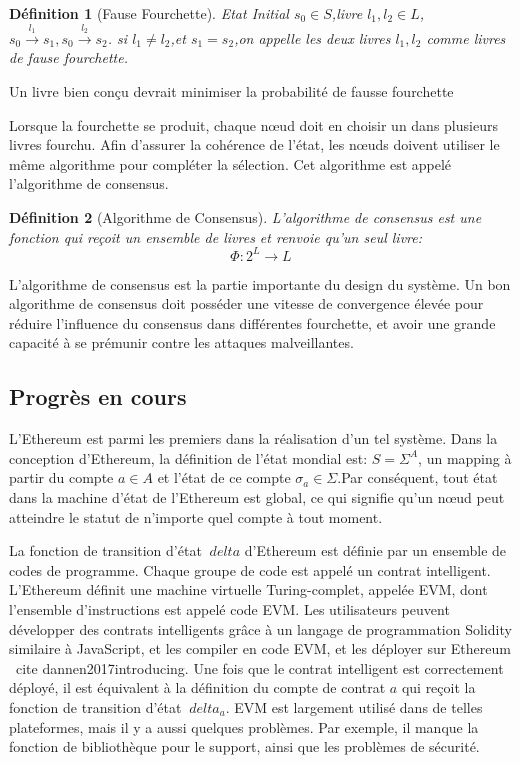 \documentclass[UTF8,nofonts]{article}
\newtheorem{definition}{Définition}[section]
\begin{document}
\begin{multicols}{2}
\begin{definition}[Fause Fourchette] \label{def:fausefourchette}
Etat Initial  $s_{0} \in S$,livre $l_{1},l_{2} \in L$,$s_{0}\overset{l_{1}}{\rightarrow}s_{1}, s_{0}\overset{l_{2}}{\rightarrow}s_{2}$. si $l_{1} \neq l_{2}$,et $s_{1}=s_{2}$,on appelle les deux livres $l_{1} ,l_{2}$ comme livres de fause fourchette.
\end{definition}

Un livre bien conçu devrait minimiser la probabilité de fausse fourchette

Lorsque la fourchette se produit, chaque nœud doit en choisir un dans plusieurs livres fourchu. Afin d'assurer la cohérence de l'état, les nœuds doivent utiliser le même algorithme pour compléter la sélection. Cet algorithme est appelé l'algorithme de consensus.

\begin{definition}[Algorithme de Consensus] \label{def:consensus}
L'algorithme de consensus est une fonction qui reçoit un ensemble de livres et renvoie qu'un seul livre:
$$\Phi: 2^{L} \rightarrow L$$
\end{definition}

L'algorithme de consensus est la partie importante du design du système. Un bon algorithme de consensus doit posséder une vitesse de convergence élevée pour réduire l'influence du consensus dans différentes fourchette, et avoir une grande capacité à se prémunir contre les attaques malveillantes.

\subsection{Progrès en cours}
L'Ethereum \cite{buterin2017ethereum}est parmi les premiers dans la réalisation d'un tel système. Dans la conception d'Ethereum, la définition de l'état mondial est: $S = \Sigma^{A}$, un mapping à partir du compte $a \in A$ et l'état de ce compte $\sigma_{a} \in \Sigma$.Par conséquent, tout état dans la machine d'état de l'Ethereum est global, ce qui signifie qu'un nœud peut atteindre le statut de n'importe quel compte à tout moment.

La fonction de transition d'état $ \ delta $ d'Ethereum est définie par un ensemble de codes de programme. Chaque groupe de code est appelé un contrat intelligent. L'Ethereum définit une machine virtuelle Turing-complet, appelée EVM, dont l'ensemble d'instructions est appelé code EVM. Les utilisateurs peuvent développer des contrats intelligents grâce à un langage de programmation Solidity similaire à JavaScript, et les compiler en code EVM, et les déployer sur Ethereum \ cite {dannen2017introducing}. Une fois que le contrat intelligent est correctement déployé, il est équivalent à la définition du compte de contrat $ a $ qui reçoit la fonction de transition d'état $ \ delta_ {a} $.
EVM est largement utilisé dans de telles plateformes, mais il y a aussi quelques problèmes. Par exemple, il manque la fonction de bibliothèque pour le support, ainsi que les problèmes de sécurité.


\end{multicols}
\end{document}
